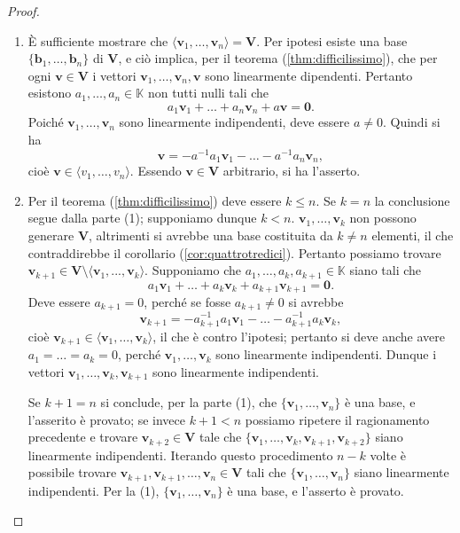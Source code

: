\documentclass{article}
\theoremstyle{plain}
\theoremstyle{definition}
\theoremstyle{remark}
\begin{document}
\begin{proof}\hfill
    \begin{enumerate}
    \item È sufficiente mostrare che \( \langle\mathbf{v}_1, \ldots, \mathbf{v}_n\rangle = \mathbf{V} \). 
    Per ipotesi esiste una base \(\{\mathbf{b}_1, \ldots, \mathbf{b}_n\} \) di \( \mathbf{V} \), e ciò implica, per il teorema (\ref{thm:difficilissimo}), che per ogni \( \mathbf{v}\in\mathbf{V} \) i vettori \( \mathbf{v}_1, \ldots, \mathbf{v}_n, \mathbf{v} \) sono linearmente dipendenti. 
    Pertanto esistono \( a_1, \ldots, a_n \in \mathbb{K} \) non tutti nulli tali che
    \[ a_1\mathbf{v}_1 + \ldots + a_n\mathbf{v}_n + a\mathbf{v} = \mathbf{0}. \]
    Poiché \( \mathbf{v}_1, \ldots, \mathbf{v}_n \) sono linearmente indipendenti, deve essere \( a \neq 0 \). 
    Quindi si ha
    \[ \mathbf{v} = -a^{-1}a_1\mathbf{v}_1 - \ldots - a^{-1}a_n\mathbf{v}_n, \]
    cioè \( \mathbf{v} \in \langle v_1, \ldots, v_n\rangle \). 
    Essendo \( \mathbf{v} \in \mathbf{V} \) arbitrario, si ha l'asserto.
    
    \item Per il teorema (\ref{thm:difficilissimo}) deve essere \( k \leq n \). 
    Se \( k = n \) la conclusione segue dalla parte (1); supponiamo dunque \( k < n \).
    \( \mathbf{v}_1, \ldots, \mathbf{v}_k \) non possono generare \( \mathbf{V} \), 
    altrimenti si avrebbe una base costituita da \( k \neq n \) elementi, il che contraddirebbe il corollario (\ref{cor:quattrotredici}). 
    Pertanto possiamo trovare \( \mathbf{v}_{k+1} \in \mathbf{V}\setminus\langle\mathbf{v}_1,...,\mathbf{v}_k\rangle \). 
    Supponiamo che \( a_1, \ldots, a_k, a_{k+1} \in \mathbb{K} \) siano tali che
    \[ a_1\mathbf{v}_1 + \ldots + a_k\mathbf{v}_k + a_{k+1}\mathbf{v}_{k+1} = \mathbf{0}. \]
    Deve essere \( a_{k+1} = 0 \), perché se fosse \( a_{k+1} \neq 0 \) si avrebbe
    \[ \mathbf{v}_{k+1} = -a_{k+1}^{-1}a_1\mathbf{v}_1 - \ldots - a_{k+1}^{-1}a_k\mathbf{v}_k, \]
    cioè \( \mathbf{v}_{k+1} \in \langle \mathbf{v}_1, \ldots, \mathbf{v}_k\rangle \), il che è contro l'ipotesi; pertanto si deve anche avere \( a_1 = \ldots = a_k = 0 \), perché \( \mathbf{v}_1, \ldots, \mathbf{v}_k \) sono linearmente indipendenti. 
    Dunque i vettori \( \mathbf{v}_1, \ldots, \mathbf{v}_k, \mathbf{v}_{k+1} \) sono linearmente indipendenti.

    Se \( k + 1 = n \) si conclude, per la parte (1), che \( \{\mathbf{v}_1, \ldots, \mathbf{v}_n\} \) è una base, e l'asserito è provato; se invece \( k + 1 < n \) possiamo ripetere il ragionamento precedente e trovare \( \mathbf{v}_{k+2} \in \mathbf{V} \) tale che \( \{\mathbf{v}_1, \ldots, \mathbf{v}_k, \mathbf{v}_{k+1}, \mathbf{v}_{k+2}\} \) siano linearmente indipendenti. 
    Iterando questo procedimento \( n - k \) volte è possibile trovare \( \mathbf{v}_{k+1}, \mathbf{v}_{k+1},  \ldots, \mathbf{v}_n \in \mathbf{V}\) tali che \( \{\mathbf{v}_1, \ldots, \mathbf{v}_n\} \) siano linearmente indipendenti. 
    Per la (1), \( \{\mathbf{v}_1, \ldots, \mathbf{v}_n\} \) è una base, e l'asserto è provato.
    \end{enumerate}
\end{proof}
\end{document}
